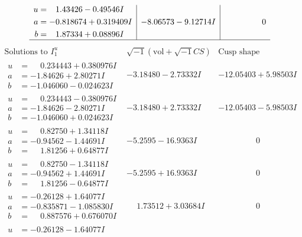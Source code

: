 \documentclass[1p]{elsarticle_modified}
\theoremstyle{definition}
\newcommand{\I}{\sqrt{-1}}
\begin{document}
$$\begin{array}{c|c|c}
\begin{aligned}
u &= \phantom{-}1.43426 - 0.49546 I \\
a &= -0.818674 + 0.319409 I \\
b &= \phantom{-}1.87334 + 0.08896 I\end{aligned}
 & -8.06573 - 9.12714 I & \phantom{-0.000000 } 0\\
 \hline 
 \end{array}$$\newpage$$\begin{array}{c|c|c}  
\text{Solutions to }I^u_{1}& \I (\text{vol} + \sqrt{-1}CS) & \text{Cusp shape}\\
 \hline 
\begin{aligned}
u &= \phantom{-}0.234443 + 0.380976 I \\
a &= -1.84626 + 2.80271 I \\
b &= -1.046060 - 0.024623 I\end{aligned}
 & -3.18480 - 2.73332 I & -12.05403 + 5.98503 I \\ \hline\begin{aligned}
u &= \phantom{-}0.234443 - 0.380976 I \\
a &= -1.84626 - 2.80271 I \\
b &= -1.046060 + 0.024623 I\end{aligned}
 & -3.18480 + 2.73332 I & -12.05403 - 5.98503 I \\ \hline\begin{aligned}
u &= \phantom{-}0.82750 + 1.34118 I \\
a &= -0.94562 - 1.44691 I \\
b &= \phantom{-}1.81256 + 0.64877 I\end{aligned}
 & -5.2595 - 16.9363 I & \phantom{-0.000000 } 0 \\ \hline\begin{aligned}
u &= \phantom{-}0.82750 - 1.34118 I \\
a &= -0.94562 + 1.44691 I \\
b &= \phantom{-}1.81256 - 0.64877 I\end{aligned}
 & -5.2595 + 16.9363 I & \phantom{-0.000000 } 0 \\ \hline\begin{aligned}
u &= -0.26128 + 1.64077 I \\
a &= -0.835871 - 1.085830 I \\
b &= \phantom{-}0.887576 + 0.676070 I\end{aligned}
 & \phantom{-}1.73512 + 3.03684 I & \phantom{-0.000000 } 0 \\ \hline\begin{aligned}
u &= -0.26128 - 1.64077 I \\

\end{aligned}
\end{array}$$
\end{document}
